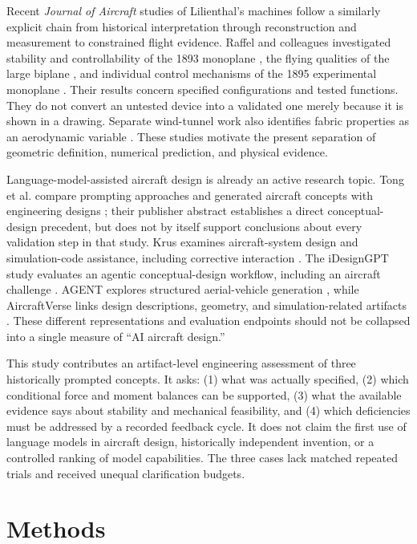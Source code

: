 \documentclass[11pt,a4paper]{article}
\begin{document}
Recent \emph{Journal of Aircraft} studies of Lilienthal's machines follow a similarly explicit chain from historical interpretation through reconstruction and measurement to constrained flight evidence. Raffel and colleagues investigated stability and controllability of the 1893 monoplane \cite{ref16}, the flying qualities of the large biplane \cite{ref17}, and individual control mechanisms of the 1895 experimental monoplane \cite{ref18}. Their results concern specified configurations and tested functions. They do not convert an untested device into a validated one merely because it is shown in a drawing. Separate wind-tunnel work also identifies fabric properties as an aerodynamic variable \cite{ref19}. These studies motivate the present separation of geometric definition, numerical prediction, and physical evidence.

Language-model-assisted aircraft design is already an active research topic. Tong et al. compare prompting approaches and generated aircraft concepts with engineering designs \cite{ref25}; their publisher abstract establishes a direct conceptual-design precedent, but does not by itself support conclusions about every validation step in that study. Krus examines aircraft-system design and simulation-code assistance, including corrective interaction \cite{ref26}. The iDesignGPT study evaluates an agentic conceptual-design workflow, including an aircraft challenge \cite{ref27}. AGENT explores structured aerial-vehicle generation \cite{ref28}, while AircraftVerse links design descriptions, geometry, and simulation-related artifacts \cite{ref29}. These different representations and evaluation endpoints should not be collapsed into a single measure of ``AI aircraft design.''

This study contributes an artifact-level engineering assessment of three historically prompted concepts. It asks: (1) what was actually specified, (2) which conditional force and moment balances can be supported, (3) what the available evidence says about stability and mechanical feasibility, and (4) which deficiencies must be addressed by a recorded feedback cycle. It does not claim the first use of language models in aircraft design, historically independent invention, or a controlled ranking of model capabilities. The three cases lack matched repeated trials and received unequal clarification budgets.

\section{Methods}
\end{document}
